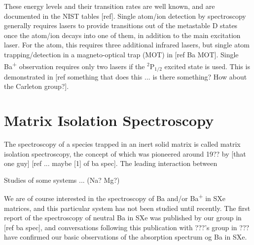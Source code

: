 These energy levels and their transition rates are well known, and are documented in the NIST tables [ref].  Single atom/ion detection by spectroscopy generally requires lasers to provide transitions out of the metastable D states once the atom/ion decays into one of them, in addition to the main excitation laser.  For the atom, this requires three additional infrared lasers, but single atom trapping/detection in a magneto-optical trap (MOT) in [ref Ba MOT].  Single Ba\textsuperscript{+} observation requires only two lasers if the $^{2}$P$_{1/2}$ excited state is used.  This is demonstrated in [ref something that does this ... is there something?  How about the Carleton group?].

\section{Matrix Isolation Spectroscopy}

The spectroscopy of a species trapped in an inert solid matrix is called matrix isolation spectroscopy, the concept of which was pioneered around 19?? by [that one guy] [ref ... maybe [1] of ba spec].  The leading interaction between 

Studies of some systems ... (Na? Mg?)

We are of course interested in the spectroscopy of Ba and/or Ba\textsuperscript{+} in SXe matrices, and this particular system has not been studied until recently.  The first report of the spectroscopy of neutral Ba in SXe was published by our group in [ref ba spec], and conversations following this publication with ???'s group in ??? have confirmed our basic observations of the absorption spectrum og Ba in SXe.  